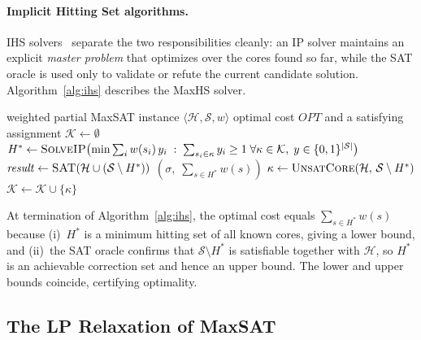 \documentclass[11pt,a4paper]{article}
\begin{document}
\paragraph{Implicit Hitting Set algorithms.}
IHS solvers~\citep{davies2011solving,davies2013exploiting} separate the two responsibilities cleanly: an IP solver maintains an explicit \emph{master problem} that optimizes over the cores found so far, while the SAT oracle is used only to validate or refute the current candidate solution. Algorithm~\ref{alg:ihs} describes the MaxHS solver.

\begin{algorithm}[t]
\caption{Implicit Hitting Set MaxSAT (MaxHS)}
\label{alg:ihs}
\begin{algorithmic}[1]
\Require weighted partial MaxSAT instance $\langle \mathcal{H}, \mathcal{S}, w \rangle$
\Ensure optimal cost $\mathit{OPT}$ and a satisfying assignment
\State $\mathcal{K} \leftarrow \emptyset$ 
\Loop
    \State $H^* \leftarrow \textsc{SolveIP}\!\left(\min \textstyle\sum_{i} w(s_i)\,y_i \;:\; \sum_{s_i \in \kappa} y_i \geq 1\;\forall \kappa \in \mathcal{K},\; y \in \{0,1\}^{|\mathcal{S}|}\right)$
    \State $\mathit{result} \leftarrow \textsc{SAT}\!\left(\mathcal{H} \cup \left(\mathcal{S} \setminus H^*\right)\right)$
        \State \Return $\!\left(\sigma,\; \textstyle\sum_{s \in H^*} w(s)\right)$
    \EndIf
    \State $\kappa \leftarrow \textsc{UnsatCore}\!\left(\mathcal{H},\, \mathcal{S} \setminus H^*\right)$
    \State $\mathcal{K} \leftarrow \mathcal{K} \cup \{\kappa\}$
\EndLoop
\end{algorithmic}
\end{algorithm}

At termination of Algorithm~\ref{alg:ihs}, the optimal cost equals $\sum_{s \in H^*} w(s)$ because (i)~$H^*$ is a minimum hitting set of all known cores, giving a lower bound, and (ii)~the SAT oracle confirms that $\mathcal{S} \setminus H^*$ is satisfiable together with $\mathcal{H}$, so $H^*$ is an achievable correction set and hence an upper bound. The lower and upper bounds coincide, certifying optimality.

\subsection{The LP Relaxation of MaxSAT}
\end{document}
